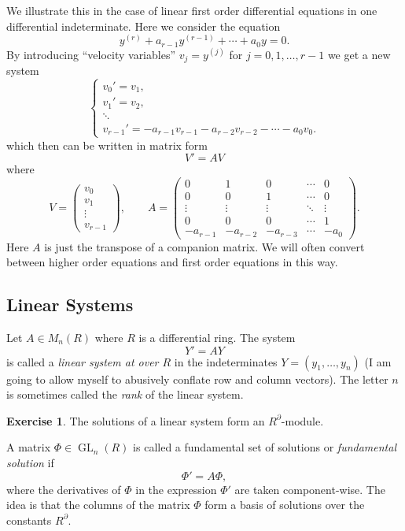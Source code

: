 \documentclass[]{book}
\numberwithin{equation}{section}
\theoremstyle{definition}
\newtheorem{exercise}[theorem]{Exercise}
\theoremstyle{remark}
\newcommand{\GL}{\operatorname{GL}}
\begin{document}
We illustrate this in the case of linear first order differential equations in one differential indeterminate. 
Here we consider the equation
 $$ y^{(r)} + a_{r-1} y^{(r-1)} + \cdots + a_0 y =0. $$
By introducing ``velocity variables'' $v_j = y^{(j)}$ for $j=0,1,\ldots, r-1$ we get a new system
$$\begin{cases}
	v_0' = v_1, \\
	v_1' = v_2 ,\\
	\ddots \\
	v_{r-1}' = -a_{r-1}v_{r-1} - a_{r-2} v_{r-2} - \cdots - a_0 v_0 .
\end{cases}$$
which then can be written in matrix form 
 $$ V' = AV $$
where 
 $$ V = \begin{pmatrix}v_0 \\
 v_1 \\
 \vdots \\
 v_{r-1} 
 \end{pmatrix}, \qquad A = \begin{pmatrix}
 0 & 1 & 0  & \cdots & 0 \\
 0 & 0 & 1 & \cdots & 0 \\
 \vdots & \vdots & \vdots & \ddots & \vdots \\
 0 & 0 & 0 & \cdots & 1 \\
 -a_{r-1} & -a_{r-2} & -a_{r-3} & \cdots & -a_0
 \end{pmatrix}.
 $$
Here $A$ is just the transpose of a companion matrix. 
We will often convert between higher order equations and first order equations in this way. 

\subsection{Linear Systems}
Let $A \in M_n(R)$ where $R$ is a differential ring.  
The system 
\begin{equation}
Y' = A Y
\end{equation}
 is called a \emph{linear system at over $R$} in the indeterminates $Y=(y_1,\ldots,y_n)$ (I am going to allow myself to abusively conflate row and column vectors). 
 The letter $n$ is sometimes called the \emph{rank} of the linear system. 
 
\begin{exercise}
	The solutions of a linear system form an $R^{\partial}$-module. 
\end{exercise}
 
A matrix $\Phi \in \GL_n(R)$ is called a fundamental set of solutions or \emph{fundamental solution} if 
 $$ \Phi' = A \Phi,$$
where the derivatives of $\Phi$ in the expression $\Phi'$ are taken component-wise. 
The idea is that the columns of the matrix $\Phi$ form a basis of solutions over the constants $R^{\partial}$.
\end{document}
